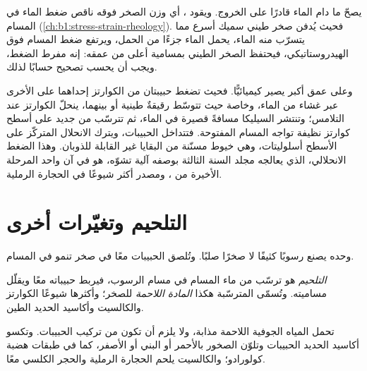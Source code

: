 يصحّ  ما دام الماء قادرًا على الخروج. ويقود  ، أي وزن الصخر فوقه ناقص ضغط الماء في المسام (\cref{ch:b1:stress-strain-rheology}). فحيث يُدفن صخر طيني سميك أسرع مما يتسرّب منه الماء، يحمل الماء جزءًا من الحمل، ويرتفع ضغط المسام فوق الهيدروستاتيكي، فيحتفظ الصخر الطيني بمسامية أعلى من عمقه: إنه مفرط الضغط، ويجب أن يحسب تصحيح  حسابًا لذلك.

وعلى عمق أكبر يصير  كيميائيًّا. فحيث تضغط حبيبتان من الكوارتز إحداهما على الأخرى عبر غشاء من الماء، وخاصة حيث تتوسّط رقيقةٌ طينية أو  بينهما، ينحلّ الكوارتز عند التلامس؛ وتنتشر السيليكا مسافةً قصيرة في الماء، ثم تترسّب من جديد على أسطح كوارتز نظيفة تواجه المسام المفتوحة. فتتداخل الحبيبات، ويترك الانحلال المتركّز على الأسطح أسلوليتات، وهي خيوط مسنّنة من البقايا غير القابلة للذوبان. وهذا الضغط الانحلالي، الذي يعالجه مجلد السنة الثالثة بوصفه آلية تشوّه، هو في آن واحد المرحلة الأخيرة من ، ومصدر أكثر  شيوعًا في الحجارة الرملية.

\section{التلحيم وتغيّرات أخرى}\label{sec:b1:diagenesis-basins:cementation}

 وحده يصنع رسوبًا كثيفًا لا صخرًا صلبًا. وتُلصق الحبيبات معًا في صخر  تنمو في المسام.

\begin{definition}\label{def:b1:diagenesis-basins:cement}
\emph{التلحيم} هو ترسّب  من ماء المسام في مسام الرسوب، فيربط حبيباته معًا ويقلّل مساميته. وتُسمّى  المترسّبة هكذا \emph{المادة اللاحمة} للصخر؛ وأكثرها شيوعًا الكوارتز والكالسيت وأكاسيد الحديد  الطين.
\end{definition}

تحمل المياه الجوفية  اللاحمة مذابة، ولا يلزم أن تكون من تركيب الحبيبات. وتكسو أكاسيد الحديد الحبيبات وتلوّن الصخور بالأحمر أو البني أو الأصفر، كما في طبقات هضبة كولورادو؛ والكالسيت يلحم الحجارة الرملية والحجر الكلسي معًا.

